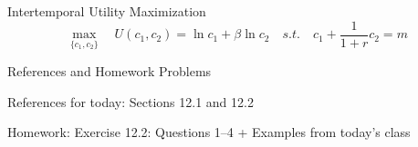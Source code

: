 \documentclass{./../../Latex/teaching_slides}
\begin{document}
\begin{frame}{Intertemporal Utility Maximization}
\vspace{-1.5em}
$$ \max_{\{c_1,c_2\}} \quad U(c_1, c_2) = \ln c_1 + \beta \ln c_2 \quad s.t. \quad c_1 + \frac{1}{1+r} c_2 = m $$
\end{frame}


\begin{frame}{References and Homework Problems}
	\begin{witemize}
  \item References for today: Sections 12.1 and 12.2
  \item Homework: Exercise 12.2: Questions 1--4 + Examples from today's class
\end{witemize}
\end{frame}
\end{document}
